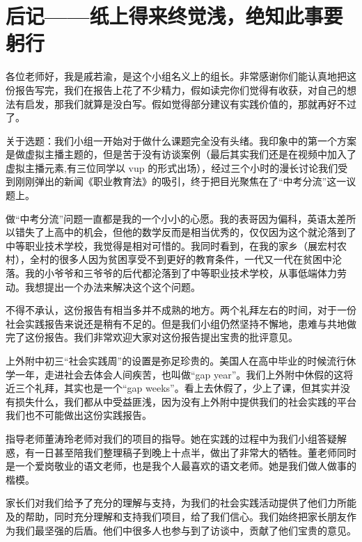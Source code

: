 \documentclass[12pt,UTF8]{ctexart}
\begin{document}
\section {后记——纸上得来终觉浅，绝知此事要躬行}
\par {
	
	各位老师好，我是戚若渝，是这个小组名义上的组长。非常感谢你们能认真地把这份报告写完，我们在报告上花了不少精力，假如读完你们觉得有收获，对自己的想法有启发，那我们就算是没白写。假如觉得部分建议有实践价值的，那就再好不过了。
}
\par {
	
	关于选题：我们小组一开始对于做什么课题完全没有头绪。我印象中的第一个方案是做虚拟主播主题的，但是苦于没有访谈案例（最后其实我们还是在视频中加入了虚拟主播元素,有三位同学以
	vup 的形式出场），经过三个小时的漫长讨论我们受到刚刚弹出的新闻《职业教育法》的吸引，终于把目光聚焦在了“中考分流”这一议题上。
}
\par {
	
	做“中考分流”问题一直都是我的一个小小的心愿。我的表哥因为偏科，英语太差所以错失了上高中的机会，但他的数学反而是相当优秀的，仅仅因为这个就沦落到了中等职业技术学校，我觉得是相对可惜的。我同时看到，在我的家乡（展宏村农村），全村的很多人因为贫困享受不到更好的教育条件，一代又一代在贫困中沦落。我的小爷爷和三爷爷的后代都沦落到了中等职业技术学校，从事低端体力劳动。我想提出一个办法来解决这个这个问题。
}
\par {
	
	不得不承认，这份报告有相当多并不成熟的地方。两个礼拜左右的时间，对于一份社会实践报告来说还是稍有不足的。但是我们小组仍然坚持不懈地，患难与共地做完了这份报告。我们非常欢迎大家对这份报告提出宝贵的批评意见。
}
\par {
	上外附中初三“社会实践周”的设置是弥足珍贵的。美国人在高中毕业的时候流行休学一年，走进社会去体会人间疾苦，也叫做“gap
	year”。我们上外附中休假的这将近三个礼拜，其实也是一个“gap
	weeks”。看上去休假了，少上了课，但其实并没有损失什么，我们都从中受益匪浅，因为没有上外附中提供我们的社会实践的平台我们也不可能做出这份实践报告。  
}
\par {
	
	指导老师董涛玲老师对我们的项目的指导。她在实践的过程中为我们小组答疑解惑，有一日甚至陪我们整理稿子到晚上十点半，做出了非常大的牺牲。董老师同时是一个爱岗敬业的语文老师，也是我个人最喜欢的语文老师。她是我们做人做事的楷模。
}
\par {
	
	家长们对我们给予了充分的理解与支持，为我们的社会实践活动提供了他们力所能及的帮助，同时充分理解和支持我们项目，给了我们信心。我们始终把家长朋友作为我们最坚强的后盾。他们中很多人也参与到了访谈中，贡献了他们宝贵的意见。
}
\end{document}
